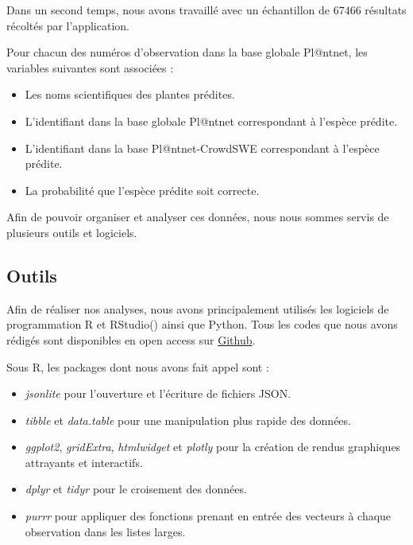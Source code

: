 \documentclass[a4paper,12pt]{article}
\begin{document}
\vspace{0.2cm}

Dans un second temps, nous avons travaillé avec un échantillon de $67 466$ résultats récoltés par l'application.

\vspace{0.2cm}

Pour chacun des numéros d'observation dans la base globale Pl@ntnet, les variables suivantes sont associées : 
\begin{itemize}
    \item Les noms scientifiques des plantes prédites.
    \item L'identifiant dans la base globale Pl@ntnet correspondant à l'espèce prédite.
    \item L'identifiant dans la base Pl@ntnet-CrowdSWE correspondant à l'espèce prédite.
    \item La probabilité que l'espèce prédite soit correcte.
\end{itemize}

Afin de pouvoir organiser et analyser ces données, nous nous sommes servis de plusieurs outils et logiciels.


\subsection{Outils}

Afin de réaliser nos analyses, nous avons principalement utilisés les logiciels de programmation R et RStudio(\cite{RStudio}) ainsi que Python. Tous les codes que nous avons rédigés sont disponibles en open access sur \href{https://github.com/lcletz/PLANTNET_M1_SSD}{Github}.

\vspace{0.2cm}

Sous R, les packages dont nous avons fait appel sont :
\begin{itemize}
    \item \textit{jsonlite} pour l'ouverture et l'écriture de fichiers JSON.
    \item \textit{tibble} et \textit{data.table} pour une manipulation plus rapide des données.
    \item \textit{ggplot2}, \textit{gridExtra}, \textit{htmlwidget} et \textit{plotly} pour la création de rendus graphiques attrayants et interactifs.
    \item \textit{dplyr} et \textit{tidyr} pour le croisement des données.
    \item \textit{purrr} pour appliquer des fonctions prenant en entrée des vecteurs à chaque observation dans les listes larges.
\end{itemize}
\end{document}
